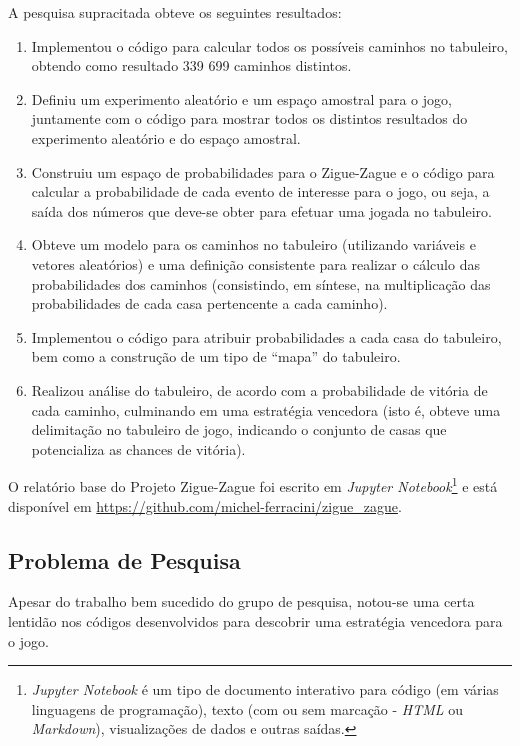 \documentclass[12pt]{article}
\newcommand{\aspas}[1]{``#1''} %
\begin{document}
A pesquisa supracitada obteve os seguintes resultados:

\begin{enumerate}
	\item Implementou o código para calcular todos os possíveis caminhos no tabuleiro, obtendo como resultado 339 699 caminhos distintos.
	\item Definiu um experimento aleatório e um espaço amostral para o jogo, juntamente com o código para mostrar todos os distintos resultados do experimento aleatório e do espaço amostral.
	\item Construiu um espaço de probabilidades para o Zigue-Zague e o código para calcular a probabilidade de cada evento de interesse para o jogo, ou seja, a saída dos números que deve-se obter para efetuar uma jogada no tabuleiro.
	\item Obteve um modelo para os caminhos no tabuleiro (utilizando variáveis e vetores aleatórios) e uma definição consistente para realizar o cálculo das probabilidades dos caminhos (consistindo, em síntese, na multiplicação das probabilidades de cada casa pertencente a cada caminho).
	\item Implementou o código para atribuir probabilidades a cada casa do tabuleiro, bem como a construção de um tipo de \aspas{mapa} do tabuleiro.
	\item Realizou análise do tabuleiro, de acordo com a probabilidade de vitória de cada caminho, culminando em uma estratégia vencedora (isto é, obteve uma delimitação no tabuleiro de jogo, indicando o conjunto de casas que potencializa as chances de vitória).
\end{enumerate}

O relatório base do Projeto Zigue-Zague foi escrito em \textit{Jupyter Notebook}\footnote{\textit{Jupyter Notebook} é um tipo de documento interativo para código (em várias linguagens de programação), texto (com ou sem marcação - \textit{HTML} ou \textit{Markdown}), visualizações de dados e outras saídas.} e está disponível em \url{https://github.com/michel-ferracini/zigue_zague}.

\subsection{Problema de Pesquisa}

Apesar do trabalho bem sucedido do grupo de pesquisa, notou-se uma certa lentidão nos códigos desenvolvidos para descobrir uma estratégia vencedora para o jogo.

\end{document}

